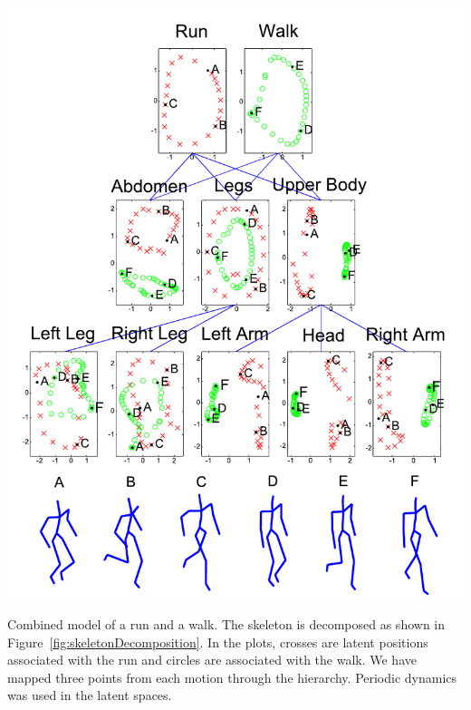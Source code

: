 \documentclass[english,color,smalltitle]{manchesterposter}
\begin{document}
\begin{multicols}{5}{\LARGE \par}
\begin{columnbox}
%
\begin{minipage}[t][1\totalheight]{1\columnwidth}%
\begin{center}
\includegraphics[width=1\textwidth]{./diagrams/demWalkRun_icml}
\par\end{center}{\LARGE \par}

\small Combined model of a run and a walk. The skeleton is decomposed
as shown in Figure~\ref{fig:skeletonDecomposition}. In the plots,
crosses are latent positions associated with the run and circles are
associated with the walk. We have mapped three points from each motion
through the hierarchy. Periodic dynamics was used in the latent spaces.\label{fig:demRunWalk1}%
\end{minipage}{\large \par}

\end{columnbox}


\begin{columnbox}
\-


\end{columnbox}
\end{multicols}
\end{document}
